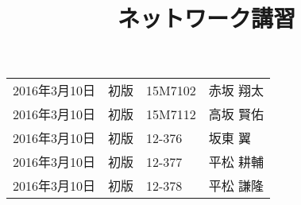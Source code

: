 \documentclass[11pt]{jarticle}
\title{ネットワーク講習}
\begin{document}
\maketitle
%
% 





%



%
%
\vspace{1cm}
\begin{table}[b]
  \begin{flushright}
    \begin{tabular}{llll}
      2016年3月10日 & 初版 & 15M7102 & 赤坂 翔太 \\
      2016年3月10日 & 初版 & 15M7112 & 高坂 賢佑 \\
      2016年3月10日 & 初版 & 12-376 & 坂東 翼 \\
      2016年3月10日 & 初版 & 12-377 & 平松 耕輔 \\
      2016年3月10日 & 初版 & 12-378 & 平松 謙隆
    \end{tabular}
  \end{flushright}
\end{table}
\end{document}
